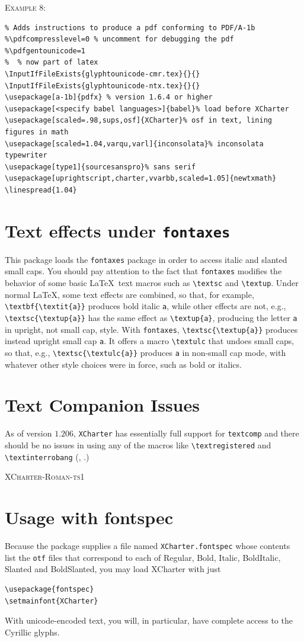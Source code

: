 \documentclass[11pt]{article}
\begin{document}
\textsc{Example 8:}
\begin{verbatim}
% Adds instructions to produce a pdf conforming to PDF/A-1b
%\pdfcompresslevel=0 % uncomment for debugging the pdf
%\pdfgentounicode=1 
%  % now part of latex
\InputIfFileExists{glyphtounicode-cmr.tex}{}{} 
\InputIfFileExists{glyphtounicode-ntx.tex}{}{}
\usepackage[a-1b]{pdfx} % version 1.6.4 or higher
\usepackage[<specify babel languages>]{babel}% load before XCharter
\usepackage[scaled=.98,sups,osf]{XCharter}% osf in text, lining figures in math
\usepackage[scaled=1.04,varqu,varl]{inconsolata}% inconsolata typewriter
\usepackage[type1]{sourcesanspro}% sans serif
\usepackage[uprightscript,charter,vvarbb,scaled=1.05]{newtxmath}
\linespread{1.04}
\end{verbatim}

\section{Text effects under \texttt{fontaxes}}
This package loads the {\tt fontaxes} package in order to access italic and slanted small caps. You should pay attention to the fact that {\tt fontaxes} modifies the behavior of some basic \LaTeX\ text macros such as \verb|\textsc| and \verb|\textup|. Under normal \LaTeX, some text effects are combined, so that, for example, \verb|\textbf{\textit{a}}| produces bold italic {\tt a}, while other effects are not, e.g., \verb|\textsc{\textup{a}}| has the same effect as \verb|\textup{a}|, producing the letter {\tt a} in upright, not small cap, style. With {\tt fontaxes}, \verb|\textsc{\textup{a}}| produces instead upright small cap {\tt a}. It offers a macro \verb|\textulc| that undoes small caps, so that, e.g., \verb|\textsc{\textulc{a}}| produces {\tt a} in non-small cap mode, with whatever other style choices were in force, such as bold or italics.

\section{Text Companion Issues}
As of version $1.206$, {\tt XCharter} has essentially full support for {\tt textcomp} and there should be no issues in using any of the macros like \verb|\textregistered| and \verb|\textinterrobang| (\textregistered, \textinterrobang.)

\textsc{XCharter-Roman-ts1}
\section{Usage with fontspec}
Because the package supplies a file named {\tt XCharter.fontspec} whose contents list the {\tt otf} files that correspond to each of Regular, Bold, Italic, BoldItalic, Slanted and BoldSlanted, you may load XCharter with just
\begin{verbatim}
\usepackage{fontspec}
\setmainfont{XCharter}
\end{verbatim}
With unicode-encoded text, you will, in particular,  have complete access to the Cyrillic glyphs.
\end{document}
